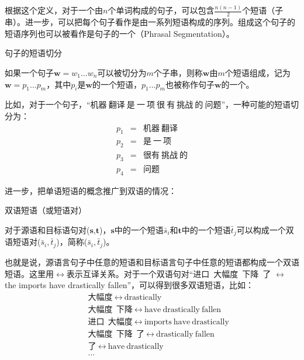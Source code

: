 \parinterval 根据这个定义，对于一个由$n$个单词构成的句子，可以包含$\frac{n(n-1)}{2}$个短语（子串）。进一步，可以把每个句子看作是由一系列短语构成的序列。组成这个句子的短语序列也可以被看作是句子的一个{\small{}}（Phrasal Segmentation）。

\vspace{0.5em}
\begin{definition} 句子的短语切分

{\small
如果一个句子$\mathbf{w} = w_1...w_n$可以被切分为$m$个子串，则称$\mathbf{w}$由$m$个短语组成，记为$\mathbf{w} = p_1...p_m$，其中$p_i$是$\mathbf{w}$的一个短语，$p_1...p_m$也被称作句子$\mathbf{w}$的一个{\small{}}。
}
\end{definition}

\parinterval 比如，对于一个句子，``$\text{机器}\ \text{翻译}\ \text{是}\ \text{一}\ \text{项}\ \text{很}\ \text{有}\ \text{挑战}\ \text{的}\ \text{问题}$''，一种可能的短语切分为：
\begin{eqnarray}
p_1 &=& \text{机器}\ \text{翻译} \nonumber \\
p_2 &=& \text{是}\ \text{一}\ \text{项} \nonumber \\
p_3 &=& \text{很有}\ \text{挑战}\ \text{的} \nonumber \\
p_4 &=& \text{问题}\nonumber
\end{eqnarray}

\parinterval 进一步，把单语短语的概念推广到双语的情况：

\vspace{0.5em}
\begin{definition} 双语短语（或短语对）

{\small
对于源语和目标语句对($\mathbf{s}$,$\mathbf{t}$)，$\mathbf{s}$中的一个短语$\bar{s}_i$和$\mathbf{t}$中的一个短语$\bar{t}_j$可以构成一个双语短语对($\bar{s}_i,\bar{t}_j$)，简称{\small{}}($\bar{s}_i,\bar{t}_j$)。
}
\end{definition}

\parinterval 也就是说，源语言句子中任意的短语和目标语言句子中任意的短语都构成一个双语短语。这里用$\leftrightarrow$表示互译关系。对于一个双语句对``进口\ 大幅度\ 下降\ 了 $\leftrightarrow$ the imports have drastically fallen''，可以得到很多双语短语，比如：
\begin{eqnarray}
&&\text{大幅度}\ \leftrightarrow\ \textrm{drastically} \nonumber \\
&&\text{大幅度}\ \ \text{下降}\ \leftrightarrow\ \textrm{have}\ \textrm{drastically}\ \textrm{fallen} \nonumber \\
&&\text{进口}\ \ \text{大幅度}\ \leftrightarrow\ \textrm{imports}\ \textrm{have}\ \textrm{drastically} \nonumber \\
&&\text{大幅度}\ \ \text{下降}\ \ \text{了}\ \leftrightarrow\ \textrm{drastically}\ \textrm{fallen} \nonumber \\
&&\text{了}\ \leftrightarrow\ \textrm{have}\ \textrm{drastically} \nonumber \\
&&... \nonumber
\end{eqnarray}

